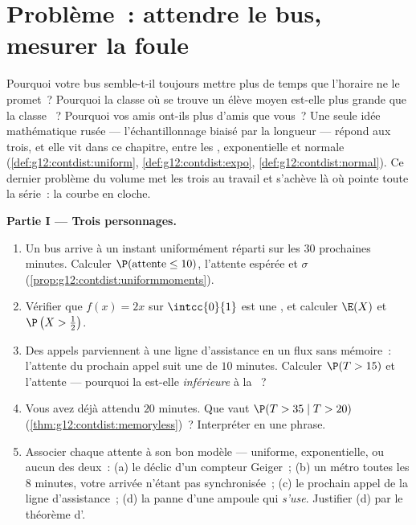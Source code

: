 \section{Problème~: attendre le bus, mesurer la foule}

\begin{problem}
\label{pb:g12:contdist:1}
Pourquoi votre bus semble-t-il toujours mettre plus de temps que
l'horaire ne le promet~? Pourquoi la classe où se trouve un élève
moyen est-elle plus grande que la classe ~? Pourquoi vos amis
ont-ils plus d'amis que vous~? Une seule idée mathématique rusée ---
l'échantillonnage biaisé par la longueur --- répond aux trois, et
elle vit dans ce chapitre, entre les , exponentielle et
normale (\cref{def:g12:contdist:uniform},
\cref{def:g12:contdist:expo}, \cref{def:g12:contdist:normal}). Ce
dernier problème du volume met les trois  au travail et
s'achève là où pointe toute la série~: la courbe en cloche.

\medskip
\noindent\textbf{Partie I --- Trois personnages.}
\begin{enumerate}
  \item Un bus arrive à un instant uniformément réparti sur les
        $30$ prochaines minutes. Calculer
        $\P(\text{attente} \leq 10)$, l'attente espérée et $\sigma$
        (\cref{prop:g12:contdist:uniformmoments}).
  \item Vérifier que $f(x) = 2x$ sur $\intcc{0}{1}$ est une
        , et calculer $\E(X)$ et
        $\P\left(X > \frac12\right)$.
  \item Des appels parviennent à une ligne d'assistance en un flux
        sans mémoire~: l'attente du prochain appel suit une  de  $10$ minutes. Calculer
        $\P(T > 15)$ et l'attente  --- pourquoi la 
        est-elle \emph{inférieure} à la ~?
  \item Vous avez déjà attendu $20$ minutes. Que vaut
        $\P(T > 35 \mid T > 20)$
        (\cref{thm:g12:contdist:memoryless})~? Interpréter en une
        phrase.
  \item Associer chaque attente à son bon modèle --- uniforme,
        exponentielle, ou aucun des deux~: (a) le déclic d'un
        compteur Geiger~; (b) un métro toutes les $8$ minutes, votre
        arrivée n'étant pas synchronisée~; (c) le prochain appel de
        la ligne d'assistance~; (d) la panne d'une ampoule qui
        \emph{s'use}. Justifier (d) par le théorème d'.
\end{enumerate}


\end{problem}
